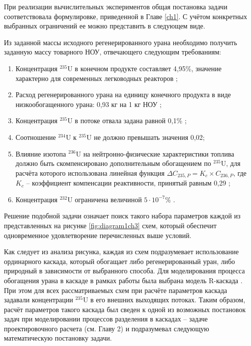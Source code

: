 При реализации вычислительных экспериментов общая постановка задачи соответствовала формулировке, приведенной в Главе \ref{ch1}. С учётом конкретных выбранных ограничений ее можно представить в следующем виде.

Из заданной массы исходного регенерированного урана необходимо получить заданную массу товарного НОУ, отвечающего следующим требованиям:

\begin{enumerate}
  \item Концентрация $^{235}$U в конечном продукте составляет 4,95\%, значение характерно для современных легководных реакторов \cite{solovevaCennostiOYaTKak2019};
  \item Расход регенерированного урана на единицу конечного продукта в виде низкообогащенного урана: 0,93 кг на 1 кг НОУ \cite{smirnovApplyingEnrichmentCapacities2018};
  \item Концентрация $^{235}$U в потоке отвала задана равной 0,1\% \cite{smirnovEvolutionIsotopicComposition2012};
  \item Соотношение $^{234}$U к $^{235}$U не должно превышать значения 0,02;
  \item Влияние изотопа $^{236}$U на нейтронно-физические характеристики топлива должно быть скомпенсировано дополнительным обогащением по $^{235}$U, для расчёта которого использована линейная функция $\Delta C_{235,P}=K_{c}\times C_{236,P}$, где $K_{c}$ -- коэффициент компенсации реактивности, принятый равным 0,29 \cite{smirnovApplyingEnrichmentCapacities2018};
  \item Концентрация $^{232}$U ограничена величиной $5\cdot10^{-7}$\% \cite{smirnovApplyingEnrichmentCapacities2018}.
\end{enumerate}

Решение подобной задачи означает поиск такого набора параметров каждой из представленных на рисунке \ref{fig:diagram1ch3} схем, который обеспечит одновременное удовлетворение перечисленных выше условий. 

Как следует из анализа рисунка, каждая из схем подразумевает использование ординарного каскада, который обогащает либо регенерированный уран, либо природный в зависимости от выбранного способа. Для моделирования процесса обогащения урана в каскаде в рамках работы была выбрана модель R-каскада \cite{sulaberidzeTeoriyaKaskadovDlya2011}. При этом для всех рассматриваемых схем при расчёте параметров каскада задавали концентрации $^{235}$U в его внешних выходящих потоках. Таким образом, расчёт параметров такого каскада был сведен к одной из возможных постановок задач при моделировании процессов разделения в каскадах -- задаче проектировочного расчета (см. Главу 2) и подразумевал следующую математическую постановку задачи. 

